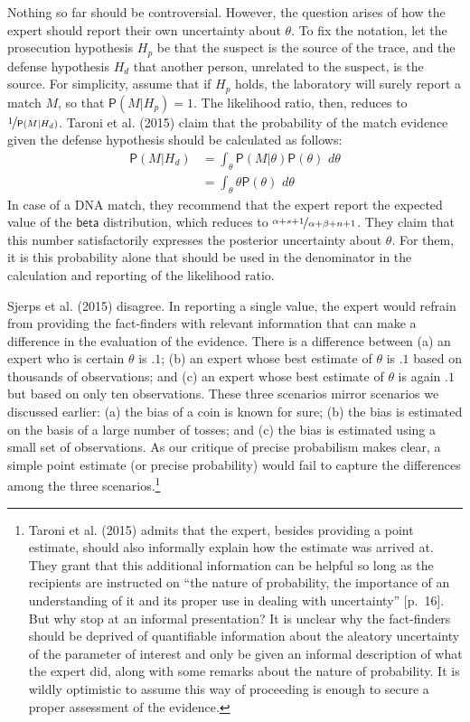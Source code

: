 \documentclass[
  10pt,
  dvipsnames,enabledeprecatedfontcommands]{scrartcl}
\newcommand{\pr}[1]{\mathsf{P}(#1)}
\newcommand{\s}[1]{\mbox{$\mathsf{#1}$}}
\begin{document}
Nothing so far should be controversial. However, the question arises of
how the expert should report their own uncertainty about \(\theta\). To
fix the notation, let the prosecution hypothesis \(H_p\) be that the
suspect is the source of the trace, and the defense hypothesis \(H_d\)
that another person, unrelated to the suspect, is the source. For
simplicity, assume that if \(H_p\) holds, the laboratory will surely
report a match \(M\), so that \(\pr{M\vert H_p}=1\). The likelihood
ratio, then, reduces to \(\nicefrac{1}{\pr{M \vert H_d}}\). Taroni et
al. (2015) claim that the probability of the match evidence given the
defense hypothesis should be calculated as follows:
\begin{align*}\pr{M \vert H_d} & = \int_{\theta} \pr{M\vert \theta} \pr{\theta}\,\, d\theta \\
& =  \int_\theta  \theta \pr{\theta}\,\, d\theta
\end{align*} In case of a DNA match, they recommend that the expert
report the expected value of the \(\s{beta}\) distribution, which
reduces to \(\nicefrac{\alpha + s + 1}{\alpha + \beta +n + 1}\). They
claim that this number satisfactorily expresses the posterior
uncertainty about \(\theta\). For them, it is this probability alone
that should be used in the denominator in the calculation and reporting
of the likelihood ratio.

Sjerps et al. (2015) disagree. In reporting a single value, the expert
would refrain from providing the fact-finders with relevant information
that can make a difference in the evaluation of the evidence. There is a
difference between (a) an expert who is certain \(\theta\) is \(.1\);
(b) an expert whose best estimate of \(\theta\) is \(.1\) based on
thousands of observations; and (c) an expert whose best estimate of
\(\theta\) is again \(.1\) but based on only ten observations. These
three scenarios mirror scenarios we discussed earlier: (a) the bias of a
coin is known for sure; (b) the bias is estimated on the basis of a
large number of tosses; and (c) the bias is estimated using a small set
of observations. As our critique of precise probabilism makes clear, a
simple point estimate (or precise probability) would fail to capture the
differences among the three scenarios.\footnote{Taroni et al. (2015)
  admits that the expert, besides providing a point estimate, should
  also informally explain how the estimate was arrived at. They grant
  that this additional information can be helpful so long as the
  recipients are instructed on ``the nature of probability, the
  importance of an understanding of it and its proper use in dealing
  with uncertainty'' {[}p.~16{]}. But why stop at an informal
  presentation? It is unclear why the fact-finders should be deprived of
  quantifiable information about the aleatory uncertainty of the
  parameter of interest and only be given an informal description of
  what the expert did, along with some remarks about the nature of
  probability. It is wildly optimistic to assume this way of proceeding
  is enough to secure a proper assessment of the evidence.}
\end{document}
